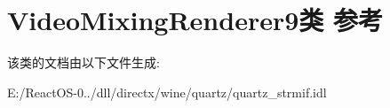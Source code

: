 \hypertarget{class_video_mixing_renderer9}{}\section{Video\+Mixing\+Renderer9类 参考}
\label{class_video_mixing_renderer9}


该类的文档由以下文件生成\+:\begin{DoxyCompactItemize}
\item 
E\+:/\+React\+O\+S-\/0../dll/directx/wine/quartz/quartz\+\_\+strmif.\+idl\end{DoxyCompactItemize}
